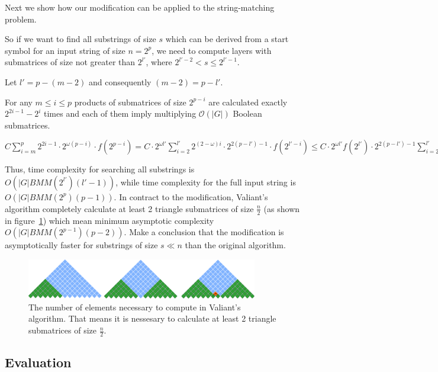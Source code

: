Next we show how our modification can be applied to the string-matching problem.

So if we want to find all substrings of size $s$ which can be derived from a start symbol for an input string of size $n = 2^p$, we need to compute layers with submatrices of size not greater than $2^{l'}$, where $2^{l' - 2} < s \le 2^{l' - 1}$.

Let $l' = p - (m - 2)$ and consequently $(m - 2) = p - l'$.

For any  $m \le i \le p$ products of submatrices of size $2^{p - i}$ are calculated exactly $2^{2i - 1} - 2^{i}$ times and each of them imply multiplying $\mathcal{O}(|G|)$ Boolean submatrices.

$ C \sum\limits_{i=m}^p 2^{2i - 1} \cdot 2^{\omega(p - i)} \cdot f(2^{p - i}) = C \cdot 2^{\omega l'}\sum\limits_{i=2}^{l'} 2^{(2 - \omega)i} \cdot 2^{2(p - l') - 1} \cdot f(2^{l' - i}) \le C \cdot 2^{\omega l'} f(2^{l'}) \cdot 2^{2(p - l') - 1} \sum\limits_{i=2}^{l'} 2^{(2 - \omega)i} = BMM(2^{l'}) \cdot 2^{2(p - l') - 1} \sum\limits_{i=2}^{l'} 2^{(2 - \omega)i}$

Thus, time complexity for searching all substrings is  $O(|G|BMM(2^{l'})(l' - 1))$, while time complexity for the full input string is $O(|G|BMM(2^p)(p - 1))$. In contract to the modification, Valiant's algorithm completely calculate at least 2 triangle submatrices of size $\frac{n}{2}$ (as shown in figure~\ref{fig5}) which mean minimum asymptotic complexity  $O(|G|BMM(2^{p - 1})(p - 2))$. Make a conclusion that the modification is asymptotically faster for substrings of size $s \ll n$  than the original algorithm.

\begin{figure}
    \centering
    \includegraphics[width=0.9\textwidth]{pictures/valsubstring.pdf}
    \caption{The number of elements necessary to compute in Valiant's algorithm. That means it is nessesary to calculate at least 2 triangle submatrices of size $\frac{n}{2}$.}
    \label{fig5}
\end{figure}

\subsection{Evaluation}

